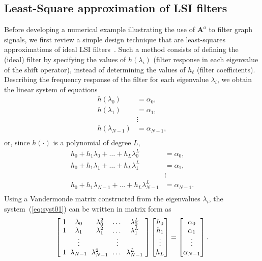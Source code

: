 \subsection{Least-Square approximation of LSI filters}\label{subsec:lsi}
Before developing a numerical example illustrating the use of $\mathbf{A}^a$ to filter graph signals, we first review a simple design technique that are least-squares approximations of ideal LSI filters~\cite{sandryhaila2014frequency}. Such a method consists of defining the (ideal) filter by specifying the values of $h(\lambda_i)$ (filter response in each eigenvalue of the shift operator), instead of determining the values of $h_{\ell}$ (filter coefficients). Describing the frequency response of the filter for each eigenvalue  $ \lambda_i $, we obtain the linear system of equations
\begin{equation}
\label{eq:siseq}
\begin{aligned}
h(\lambda_0) &= \alpha_0, \\
h(\lambda_1) &= \alpha_1, \\
&\vdots \\
h(\lambda_{N-1}) &= \alpha_{N-1}, \\
\end{aligned}
\end{equation}
or, since $ h(\cdot) $ is a polynomial of degree $ L $,
\begin{equation}\label{eq:syst01}
\begin{aligned}
h_0 + h_1 \lambda_0 + \dots + h_L \lambda^L_0 &= \alpha_0, \\
h_0 + h_1 \lambda_1 + \dots  + h_L \lambda^L_1 &= \alpha_1, \\
&\vdots \\
h_0 + h_1 \lambda_{N-1} + \dots + h_L \lambda^L_{N-1} &= \alpha_{N-1}. \\
\end{aligned}
\end{equation}
Using a Vandermonde matrix constructed from the eigenvalues $\lambda_i$, the system~(\ref{eq:syst01}) can be written in matrix form as
\begin{equation}\label{eq:siseq2}
\setlength{\arraycolsep}{3pt}
\left[\begin{array}{ccccc}
1 & \lambda_0 & \lambda^2_0 & \dots & \lambda^L_0 \\
1 & \lambda_1 & \lambda^2_1 & \dots & \lambda^L_1 \\
& \vdots & & \vdots & \\
1 & \lambda_{N-1} & \lambda^2_{N-1} & \dots & \lambda^L_{N-1} \\
\end{array}\right]
\begin{bmatrix}
h_0 \\
h_1 \\
\vdots \\
h_L
\end{bmatrix} =
\begin{bmatrix}
\alpha_0 \\
\alpha_1 \\
\vdots \\
\alpha_{N-1}
\end{bmatrix}.
\end{equation}
